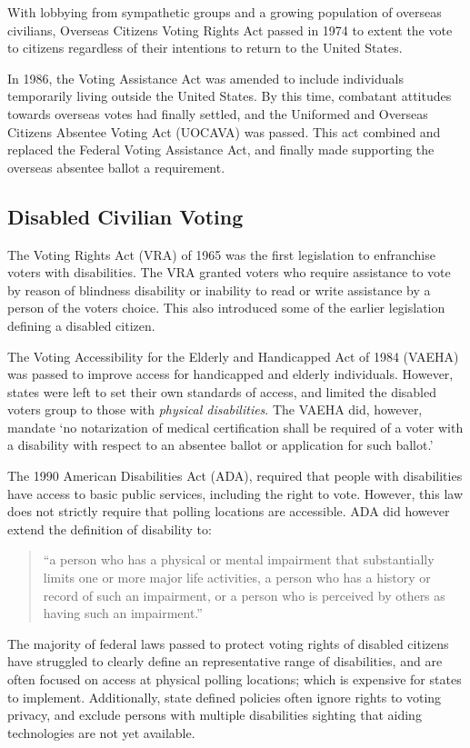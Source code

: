 With lobbying from sympathetic groups and a growing population of overseas
civilians, Overseas Citizens Voting Rights Act passed in 1974 to extent the
vote to citizens regardless of their intentions to return to the United
States.

In 1986, the Voting Assistance Act was amended to include individuals
temporarily living outside the United States. By this time, combatant attitudes
towards overseas votes had finally settled, and the Uniformed and Overseas
Citizens Absentee Voting Act (UOCAVA) was passed. This act combined and
replaced the Federal Voting Assistance Act, and finally made supporting the
overseas absentee ballot a requirement.

\subsection{Disabled Civilian Voting}
The Voting Rights Act (VRA) of 1965 was the first legislation to
enfranchise voters with disabilities. The VRA granted voters who require
assistance to vote by reason of blindness disability or inability to read or
write assistance by a person of the voters choice. This also introduced some of
the earlier legislation defining a disabled citizen.

The Voting Accessibility for the Elderly and Handicapped Act of 1984 (VAEHA)
was passed to improve access for handicapped and elderly individuals. However,
states were left to set their own standards of access, and limited the disabled
voters group to those with {\em physical disabilities}. The VAEHA did, however,
mandate `no notarization of medical certification shall be required of a voter
with a disability with respect to an absentee ballot or application for such
ballot.'

The 1990 American Disabilities Act (ADA), required that people with
disabilities have access to basic public services, including the right to vote.
However, this law does not strictly require that polling locations are
accessible. ADA did however extend the definition of disability to:
\begin{quote}
``a person who has a physical or mental impairment that substantially limits
one or more major life activities, a person who has a history or record of such
an impairment, or a person who is perceived by others as having such an
impairment.''
\end{quote}

The majority of federal laws passed to protect voting rights of disabled
citizens have struggled
to clearly define an representative range of disabilities, and are often
focused on access at physical polling locations; which is expensive for states
to implement. Additionally, state defined policies often ignore rights to
voting privacy, and exclude persons with multiple disabilities sighting that
aiding technologies are not yet available.

